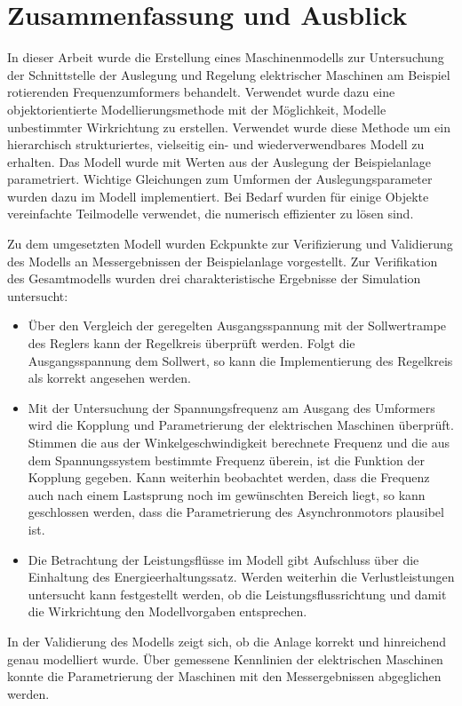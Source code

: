 \chapter{Zusammenfassung und Ausblick}
\label{chap:ZusammenfassungAusblick}
In dieser Arbeit wurde die Erstellung eines Maschinenmodells zur Untersuchung der Schnittstelle der Auslegung und Regelung elektrischer Maschinen am Beispiel rotierenden Frequenzumformers behandelt. Verwendet wurde dazu eine objektorientierte Modellierungsmethode mit der Möglichkeit, Modelle unbestimmter Wirkrichtung zu erstellen. Verwendet wurde diese Methode um ein hierarchisch strukturiertes, vielseitig ein- und wiederverwendbares Modell zu erhalten. Das Modell wurde mit Werten aus der Auslegung der Beispielanlage parametriert. Wichtige Gleichungen zum Umformen der Auslegungsparameter wurden dazu im Modell implementiert. Bei Bedarf wurden für einige Objekte vereinfachte Teilmodelle verwendet, die numerisch effizienter zu lösen sind.

Zu dem umgesetzten Modell wurden Eckpunkte zur Verifizierung und Validierung des Modells an Messergebnissen der Beispielanlage vorgestellt. Zur Verifikation des Gesamtmodells wurden drei charakteristische Ergebnisse der Simulation untersucht:
\begin{itemize}
	\item Über den Vergleich der geregelten Ausgangsspannung mit der Sollwertrampe des Reglers kann der Regelkreis überprüft werden. Folgt die Ausgangsspannung dem Sollwert, so kann die Implementierung des Regelkreis als korrekt angesehen werden.
	\item Mit der Untersuchung der Spannungsfrequenz am Ausgang des Umformers wird die Kopplung und Parametrierung der elektrischen Maschinen überprüft. Stimmen die aus der Winkelgeschwindigkeit berechnete Frequenz und die aus dem Spannungssystem bestimmte Frequenz überein, ist die Funktion der Kopplung gegeben. Kann weiterhin beobachtet werden, dass die Frequenz auch nach einem Lastsprung noch im gewünschten Bereich liegt, so kann geschlossen werden, dass die Parametrierung des Asynchronmotors plausibel ist.
	\item Die Betrachtung der Leistungsflüsse im Modell gibt Aufschluss über die Einhaltung des Energieerhaltungssatz. Werden weiterhin die Verlustleistungen untersucht kann festgestellt werden, ob die Leistungsflussrichtung und damit die Wirkrichtung den Modellvorgaben entsprechen.
\end{itemize}
In der Validierung des Modells zeigt sich, ob die Anlage korrekt und hinreichend genau modelliert wurde. Über gemessene Kennlinien der elektrischen Maschinen konnte die Parametrierung der Maschinen mit den Messergebnissen abgeglichen werden.

